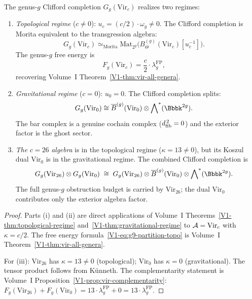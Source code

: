 \begin{theorem}
The genus-$g$ Clifford completion $G_g(\mathrm{Vir}_c)$ realizes two
regimes:

\begin{enumerate}[label=\textup{(\roman*)}]
\item \emph{Topological regime} ($c \neq 0$):\;
$u_c = (c/2) \cdot \omega_g \neq 0$. The Clifford completion is
Morita equivalent to the transgression algebra:
\[
G_g(\mathrm{Vir}_c)
\simeq_{\mathrm{Morita}}
\mathrm{Mat}_{2^g}\bigl(B_\Theta^{(g)}(\mathrm{Vir}_c)[u_c^{-1}]\bigr).
\]
The genus-$g$ free energy is
\begin{equation}%
F_g(\mathrm{Vir}_c)
= \frac{c}{2} \cdot \lambda_g^{\mathrm{FP}},
\end{equation}
recovering Volume~I Theorem~\ref{V1-thm:vir-all-genera}.

\item \emph{Gravitational regime} ($c = 0$):\;
$u_0 = 0$. The Clifford completion splits:
\[
G_g(\mathrm{Vir}_0)
\cong
\barB^{(g)}(\mathrm{Vir}_0)
\otimes \bigwedge\nolimits^*(\Bbbk^{2g}).
\]
The bar complex is a genuine cochain complex ($d_{\mathrm{fib}}^{\,2} = 0$)
and the exterior factor is the ghost sector.

\item \emph{The $c = 26$ algebra}\/ is in the topological regime
($\kappa = 13 \neq 0$), but its Koszul dual $\mathrm{Vir}_0$ is in
the gravitational regime. The combined Clifford completion is
\begin{equation}%
G_g(\mathrm{Vir}_{26}) \otimes G_g(\mathrm{Vir}_0)
\;\cong\;
G_g(\mathrm{Vir}_{26})
\otimes \barB^{(g)}(\mathrm{Vir}_0)
\otimes \bigwedge\nolimits^*(\Bbbk^{2g}).
\end{equation}
The full genus-$g$ obstruction budget is carried by
$\mathrm{Vir}_{26}$; the dual $\mathrm{Vir}_0$ contributes only the
exterior algebra factor.
\end{enumerate}
\end{theorem}

\begin{proof}
Parts (i) and (ii) are direct applications of
Volume~I Theorems~\ref{V1-thm:topological-regime}
and~\ref{V1-thm:gravitational-regime} to $\mathcal{A} = \mathrm{Vir}_c$ with
$\kappa = c/2$. The free energy
formula~\eqref{V1-eq:g9-partition-topo} is Volume~I Theorem~\ref{V1-thm:vir-all-genera}.

For (iii): $\mathrm{Vir}_{26}$ has $\kappa = 13 \neq 0$
(topological); $\mathrm{Vir}_0$ has $\kappa = 0$ (gravitational).
The tensor product follows from K\"unneth. The
complementarity statement is
Volume~I Proposition~\ref{V1-prop:vir-complementarity}: $F_g(\mathrm{Vir}_{26}) +
F_g(\mathrm{Vir}_0) = 13 \cdot \lambda_g^{\mathrm{FP}} + 0 =
13 \cdot \lambda_g^{\mathrm{FP}}$.
\end{proof}

